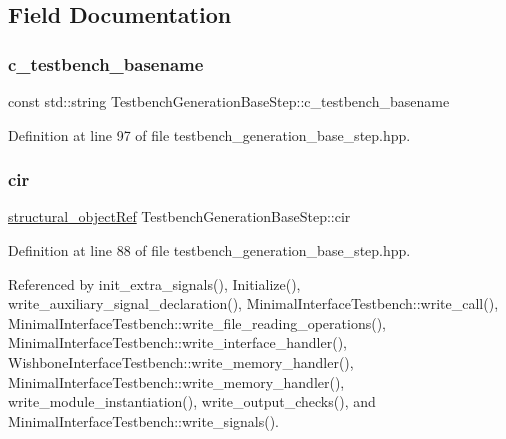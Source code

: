 \subsection{Field Documentation}
\mbox{\label{classTestbenchGenerationBaseStep_af264e2da91d4dd727725ea5d6b3136c1}} 
\subsubsection{\texorpdfstring{c\+\_\+testbench\+\_\+basename}{c\_testbench\_basename}}
{\footnotesize\ttfamily const std\+::string Testbench\+Generation\+Base\+Step\+::c\+\_\+testbench\+\_\+basename\hspace{0.3cm}{\ttfamily [protected]}}



Definition at line 97 of file testbench\+\_\+generation\+\_\+base\+\_\+step.\+hpp.

\mbox{\label{classTestbenchGenerationBaseStep_a5b4a2578b7e7e6a70f5900082ab08279}} 
\subsubsection{\texorpdfstring{cir}{cir}}
{\footnotesize\ttfamily \hyperlink{structural__objects_8hpp_a8ea5f8cc50ab8f4c31e2751074ff60b2}{structural\+\_\+object\+Ref} Testbench\+Generation\+Base\+Step\+::cir\hspace{0.3cm}{\ttfamily [protected]}}



Definition at line 88 of file testbench\+\_\+generation\+\_\+base\+\_\+step.\+hpp.



Referenced by init\+\_\+extra\+\_\+signals(), Initialize(), write\+\_\+auxiliary\+\_\+signal\+\_\+declaration(), Minimal\+Interface\+Testbench\+::write\+\_\+call(), Minimal\+Interface\+Testbench\+::write\+\_\+file\+\_\+reading\+\_\+operations(), Minimal\+Interface\+Testbench\+::write\+\_\+interface\+\_\+handler(), Wishbone\+Interface\+Testbench\+::write\+\_\+memory\+\_\+handler(), Minimal\+Interface\+Testbench\+::write\+\_\+memory\+\_\+handler(), write\+\_\+module\+\_\+instantiation(), write\+\_\+output\+\_\+checks(), and Minimal\+Interface\+Testbench\+::write\+\_\+signals().

